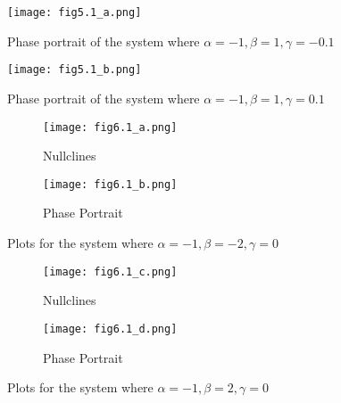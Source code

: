 \begin{figure}[H]
    \centering
    \texttt{[image: fig5.1\_a.png]}
    \caption{Phase portrait of the system where $\alpha=-1, \beta=1, \gamma=-0.1$}
    \label{fig:9}
\end{figure}
\begin{figure}[H]
    \centering
    \texttt{[image: fig5.1\_b.png]}
    \caption{Phase portrait of the system where $\alpha=-1, \beta=1, \gamma=0.1$}
    \label{fig:10}
\end{figure}

\begin{figure}[H]
    \centering
    \begin{subfigure}{.49\textwidth}
        \centering
        \texttt{[image: fig6.1\_a.png]}
        \caption{Nullclines}
    \end{subfigure}
    \begin{subfigure}{.49\textwidth}
        \centering
        \texttt{[image: fig6.1\_b.png]}
        \caption{Phase Portrait}
    \end{subfigure}
    \caption{Plots for the system where $\alpha=-1, \beta=-2, \gamma=0$}
    \label{fig:11}
\end{figure}
\begin{figure}[H]
    \centering
    \begin{subfigure}{.49\textwidth}
        \centering
        \texttt{[image: fig6.1\_c.png]}
        \caption{Nullclines}
    \end{subfigure}
    \begin{subfigure}{.49\textwidth}
        \centering
        \texttt{[image: fig6.1\_d.png]}
        \caption{Phase Portrait}
    \end{subfigure}
    \caption{Plots for the system where $\alpha=-1, \beta=2, \gamma=0$}
    \label{fig:12}
\end{figure}
